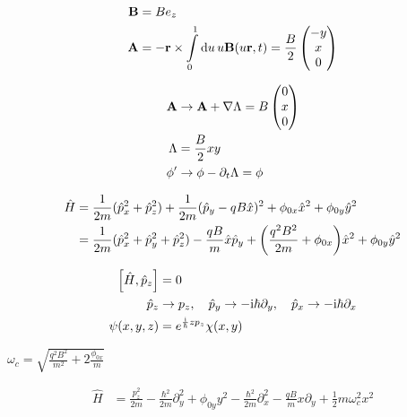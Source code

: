 \documentclass[a4paper,10pt]{article}
\newcommand{\mi}{\mathrm{i}}
\newcommand{\intl}{\int\limits}
\begin{document}
\begin{align}
    \vb{B}
    &=
    B{e}_z
\\
    \vb{A}
    &=
    -
    \vb{r}
    \times
    \intl_0^1
    \dd{u}
    u
    \vb{B}(u\vb{r},t)
    =
    \frac{B}{2}
    \pmqty{
        -y\\x\\0
    }
\end{align}

\begin{align}
    \vb{A}
    &\to
    \vb{A}
    +
    \nabla
    \Lambda
    =
    B
    \pmqty{
        0\\x\\0
    }
\\
    \Lambda
    &=
    \frac{B}{2}
    xy
\\
    \phi^\prime
    &\to
    \phi-\partial_t \Lambda=\phi
\end{align}

\begin{align}
    \hat{H}
    &=
    \frac{1}{2m}
    (\hat{p}_x^2+\hat{p}_z^2)
    +
    \frac{1}{2m}
    (\hat{p}_y-qB\hat{x})^2
    +
    \phi_{0x}
    \hat{x}^2
    +
    \phi_{0y}
    \hat{y}^2
\\
    &=
    \frac{1}{2m}
    (\hat{p}_x^2+\hat{p}_y^2+\hat{p}_z^2)
    -
    \frac{qB}{m}
    \hat{x}
    \hat{p}_y
    +
    \pqty{
	    \frac{q^2B^2}{2m}
	    +
    		\phi_{0x}
    	}
    \hat{x}^2
    +
    \phi_{0y}
    \hat{y}^2
\end{align}


\begin{align}
    \bqty{
        \hat{H}
        ,
        \hat{p}_z
    }
    &=
    0
\\
    \hat{p}_z
    &\to
    p_z
    ,\quad
    \hat{p}_y
    \to
    -\mi\hbar\partial_y
    ,\quad
    \hat{p}_x
    \to
    -\mi\hbar\partial_x
\\
    \psi(x,y,z)
    &=
    e^{
        \frac{\mi}{\hbar}
        zp_z
    }
    \chi(x,y)
\end{align}

$\omega_c=\sqrt{\frac{q^2 B^2}{m^2}+2\frac{\phi_{0x}}{m}}$



\begin{align}
	\hat{H}    
    &=
    \frac{p_z^2}{2m}
    	-
    \frac{\hbar^2}{2m}    
    \partial_y^2
    +
    \phi_{0y}
    y^2
	-
    \frac{\hbar^2}{2m}    
    \partial_x^2
    -
    \frac{qB}{m}
    x
    \partial_y
    +
    \frac{1}{2}
    m\omega_c^2
    x^2
\end{align}
\end{document}
